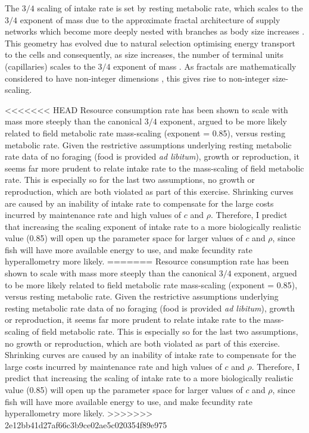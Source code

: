 \documentclass[a4paper]{article} %
\begin{document}
\begin{center}
\begin{minipage}{\linewidth}
The $3/4$ scaling of intake rate is set by resting metabolic rate, which scales to the $3/4$ exponent of mass \autocite{Kleiber1947, peters1983, niklas1994plant} due to the approximate fractal architecture of supply networks which become more deeply nested with branches as body size increases \autocite{West1997}. This geometry has evolved due to natural selection optimising energy transport to the cells and consequently, as size increases, the number of terminal units (capillaries) scales to the $3/4$ exponent of mass \autocite{West1997, West2005}. As fractals are mathematically considered to have non-integer dimensions \autocite{Hausdorff1918, Mandelbrot1982}, this gives rise to non-integer size-scaling. 

<<<<<<< HEAD
Resource consumption rate has been shown to scale with mass more steeply than the canonical $3/4$ exponent, argued to be more likely related to field metabolic rate mass-scaling (exponent = 0.85), versus resting metabolic rate. Given the restrictive assumptions underlying resting metabolic rate data of no foraging (food is provided \textit{ad libitum}), growth or reproduction, it seems far more prudent to relate intake rate to the mass-scaling of field metabolic rate. This is especially so for the last two assumptions, no growth or reproduction, which are both violated as part of this exercise. Shrinking curves are caused by an inability of intake rate to compensate for the large costs incurred by maintenance rate and high values of $c$ and $\rho$. Therefore, I predict that increasing the scaling exponent of intake rate to a more biologically realistic value (0.85) will open up the parameter space for larger values of $c$ and $\rho$, since fish will have more available energy to use, and make fecundity rate hyperallometry more likely.
=======
Resource consumption rate has been shown to scale with mass more steeply than the canonical $3/4$ exponent, argued to be more likely related to field metabolic rate mass-scaling (exponent = 0.85), versus resting metabolic rate. Given the restrictive assumptions underlying resting metabolic rate data of no foraging (food is provided \textit{ad libitum}), growth or reproduction, it seems far more prudent to relate intake rate to the mass-scaling of field metabolic rate. This is especially so for the last two assumptions, no growth or reproduction, which are both violated as part of this exercise. Shrinking curves are caused by an inability of intake rate to compensate for the large costs incurred by maintenance rate and high values of $c$ and $\rho$. Therefore, I predict that increasing the scaling of intake rate to a more biologically realistic value (0.85) will open up the parameter space for larger values of $c$ and $\rho$, since fish will have more available energy to use, and make fecundity rate hyperallometry more likely.
>>>>>>> 2e12bb41d27af66c3b9ce02ae5c020354f89e975


\end{minipage}
\end{center}
\end{document}
